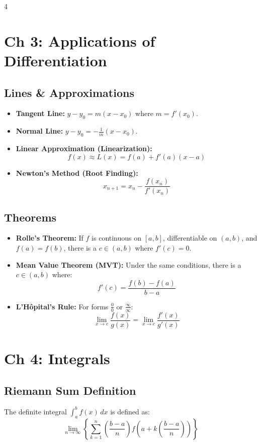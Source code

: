 \documentclass[8pt, landscape, a4paper]{scrartcl}
\begin{document}
\begin{multicols*}{4}
\section*{Ch 3: Applications of Differentiation}
\subsection*{Lines \& Approximations}
\begin{itemize}
    \item \textbf{Tangent Line:} $y - y_0 = m(x - x_0)$ where $m = f'(x_0)$.
    \item \textbf{Normal Line:} $y - y_0 = -\frac{1}{m}(x - x_0)$.
    \item \textbf{Linear Approximation (Linearization):}
    \[ f(x) \approx L(x) = f(a) + f'(a)(x-a) \]
    \item \textbf{Newton's Method (Root Finding):}
    \[ x_{n+1} = x_n - \frac{f(x_n)}{f'(x_n)} \]
\end{itemize}

\subsection*{Theorems}
\begin{itemize}
    \item \textbf{Rolle's Theorem:} If $f$ is continuous on $[a, b]$, differentiable on $(a, b)$, and $f(a) = f(b)$, there is a $c \in (a, b)$ where $f'(c) = 0$.
    \item \textbf{Mean Value Theorem (MVT):} Under the same conditions, there is a $c \in (a, b)$ where:
    \[ f'(c) = \frac{f(b) - f(a)}{b - a} \]
    \item \textbf{L'Hôpital's Rule:} For forms $\frac{0}{0}$ or $\frac{\infty}{\infty}$:
    \[ \lim_{x \to c} \frac{f(x)}{g(x)} = \lim_{x \to c} \frac{f'(x)}{g'(x)} \]
\end{itemize}

\section*{Ch 4: Integrals}
\subsection*{Riemann Sum Definition}
The definite integral $\int_{a}^{b} f(x) \, dx$ is defined as:
\[ \lim_{n\to\infty} \left\{ \sum_{k=1}^{n} \left(\frac{b-a}{n}\right) f\left(a + k\left(\frac{b-a}{n}\right)\right) \right\} \]


\end{multicols*}
\end{document}
